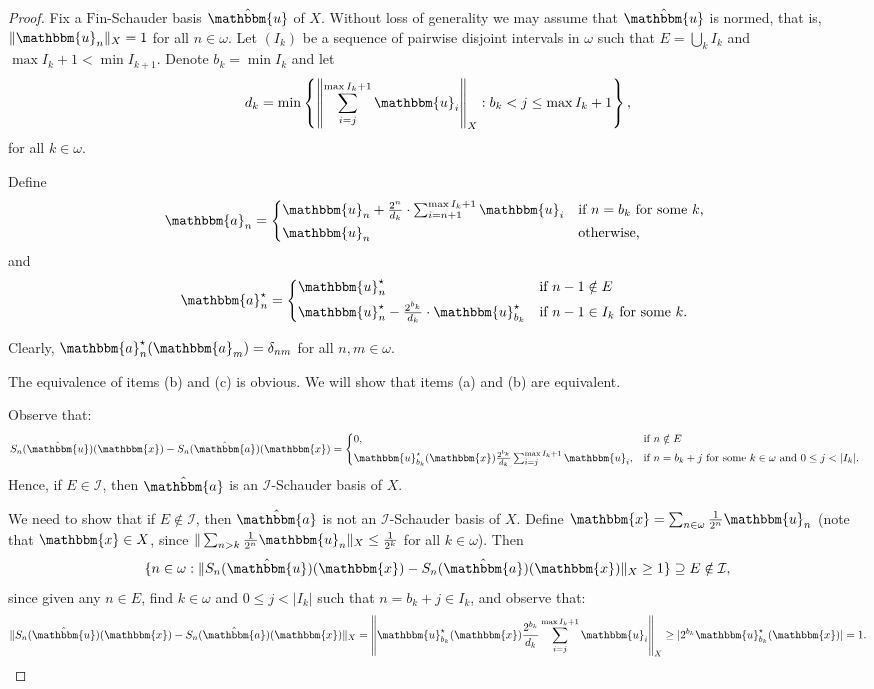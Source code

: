 \documentclass[10pt,a4paper]{amsart}
\newcommand{\I}{\mathcal{I}}
\newcommand{\Fin}{\mathrm{Fin}}
\newcommand{\w}{\mathbbm}
\begin{document}
\begin{proof}
Fix a $\Fin$-Schauder basis $\hat{\w{u}}$ of $X$. Without loss of generality we may assume that $\hat{\w{u}}$ is normed, that is, $\|\w{u}_n\|_X=1$ for all $n\in\omega$. Let $(I_k)$ be a sequence of pairwise disjoint intervals in $\omega$ such that $E=\bigcup_k I_k$ and $\max I_k+1<\min I_{k+1}$. Denote $b_k=\min I_k$ and let 
\[
d_k=\min\left\{\left\|\sum_{i=j}^{\max I_k+1} \w{u}_{i}\right\|_X: b_k<j\leq \max I_k+1\right\},
\]
for all $k\in\omega$.

Define 
\[
    \w{a}_n =
    \begin{cases*}
    \w{u}_{n}+\frac{2^n}{d_k}\cdot\sum_{i=n+1}^{\max I_k+1} \w{u}_{i}     & if $n=b_k$ for some $k$, \\
    \w{u}_n & otherwise,  \\
    \end{cases*}
  \]
and
\[
    \w{a}_n^\star =
    \begin{cases*}
    \w{u}_n^\star & if  $n-1\notin E$  \\
    \w{u}_{n}^\star - \frac{2^{b_k}}{d_k}\cdot \w{u}_{b_k}^\star & if $n-1\in I_k$ for some $k$.
    \end{cases*}
  \]

Clearly, $\w{a}^\star_n(\w{a}_m)=\delta_{nm}$ for all $n,m\in\omega$.

The equivalence of items (b) and (c) is obvious. We will show that items (a) and (b) are equivalent.

Observe that:
\[
S_n(\hat{\w{u}})(\w{x})-S_n(\hat{\w{a}})(\w{x})=\begin{cases*}
    0, & if  $n\notin E$  \\
    \w{u}^\star_{b_k}(\w{x})\frac{2^{b_k}}{d_k}\sum_{i=j}^{\max I_k+1}\w{u}_i, & if $n=b_k+j$ for some $k\in\omega$ and $0\leq j<|I_k|$.
    \end{cases*}
\]
Hence, if $E\in\I$, then $\hat{\w{a}}$ is an $\I$-Schauder basis of $X$. 

We need to show that if $E\notin\I$, then $\hat{\w{a}}$ is not an $\I$-Schauder basis of $X$. Define $\w{x}=\sum_{n\in\omega}\frac{1}{2^n}\w{u}_n$ (note that $\w{x}\in X$, since $\|\sum_{n>k}\frac{1}{2^n}\w{u}_n\|_X\leq\frac{1}{2^k}$ for all $k\in\omega$). Then 
\[
\{n\in\omega: \|S_n(\hat{\w{u}})(\w{x})-S_n(\hat{\w{a}})(\w{x})\|_X\geq 1\}\supseteq E\notin\I,
\]
since given any $n\in E$, find $k\in\omega$ and $0\leq j<|I_k|$ such that $n=b_k+j\in I_k$, and observe that:
\[
\|S_n(\hat{\w{u}})(\w{x})-S_n(\hat{\w{a}})(\w{x})\|_X=\left\|\w{u}^\star_{b_k}(\w{x})\frac{2^{b_k}}{d_k}\sum_{i=j}^{\max I_k+1}\w{u}_i\right\|_X\geq |2^{b_k}\w{u}^\star_{b_k}(\w{x})|=1.
\]
\end{proof}
\end{document}
